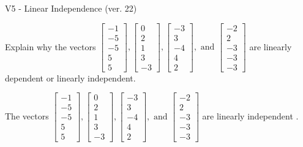 \begin{exercise}
  \begin{exerciseTitle}V5 - Linear Independence (ver. 22)\end{exerciseTitle}
  \begin{exerciseStatement}
    Explain why the vectors \(\left[\begin{array}{r}
-1 \\
-5 \\
-5 \\
5 \\
5
\end{array}\right] , \left[\begin{array}{r}
0 \\
2 \\
1 \\
3 \\
-3
\end{array}\right] , \left[\begin{array}{r}
-3 \\
3 \\
-4 \\
4 \\
2
\end{array}\right] , \text{ and } \left[\begin{array}{r}
-2 \\
2 \\
-3 \\
-3 \\
-3
\end{array}\right]\) are linearly dependent or linearly independent.	


  \end{exerciseStatement}
  \begin{exerciseAnswer}
   The vectors \(\left[\begin{array}{r}
-1 \\
-5 \\
-5 \\
5 \\
5
\end{array}\right] , \left[\begin{array}{r}
0 \\
2 \\
1 \\
3 \\
-3
\end{array}\right] , \left[\begin{array}{r}
-3 \\
3 \\
-4 \\
4 \\
2
\end{array}\right] , \text{ and } \left[\begin{array}{r}
-2 \\
2 \\
-3 \\
-3 \\
-3
\end{array}\right]\) are 
  	 linearly independent  .
  


  \end{exerciseAnswer}
\end{exercise}